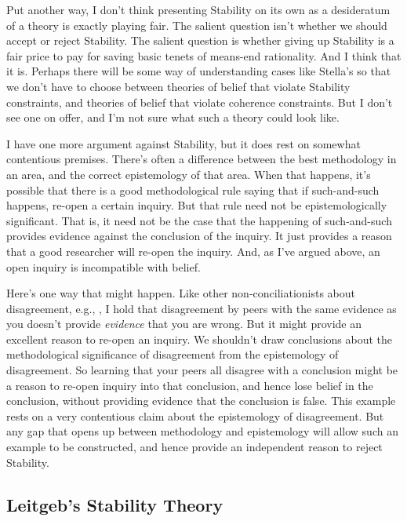 \documentclass[11pt,]{book}
\begin{document}
Put another way, I don't think presenting Stability on its own as a desideratum of a theory is exactly playing fair. The salient question isn't whether we should accept or reject Stability. The salient question is whether giving up Stability is a fair price to pay for saving basic tenets of means-end rationality. And I think that it is. Perhaps there will be some way of understanding cases like Stella's so that we don't have to choose between theories of belief that violate Stability constraints, and theories of belief that violate coherence constraints. But I don't see one on offer, and I'm not sure what such a theory could look like.

I have one more argument against Stability, but it does rest on somewhat contentious premises. There's often a difference between the best methodology in an area, and the correct epistemology of that area. When that happens, it's possible that there is a good methodological rule saying that if such-and-such happens, re-open a certain inquiry. But that rule need not be epistemologically significant. That is, it need not be the case that the happening of such-and-such provides evidence against the conclusion of the inquiry. It just provides a reason that a good researcher will re-open the inquiry. And, as I've argued above, an open inquiry is incompatible with belief.

Here's one way that might happen. Like other non-conciliationists about disagreement, e.g., \citet{Kelly2010-KELPDA}, I hold that disagreement by peers with the same evidence as you doesn't provide \emph{evidence} that you are wrong. But it might provide an excellent reason to re-open an inquiry. We shouldn't draw conclusions about the methodological significance of disagreement from the epistemology of disagreement. So learning that your peers all disagree with a conclusion might be a reason to re-open inquiry into that conclusion, and hence lose belief in the conclusion, without providing evidence that the conclusion is false. This example rests on a very contentious claim about the epistemology of disagreement. But any gap that opens up between methodology and epistemology will allow such an example to be constructed, and hence provide an independent reason to reject Stability.

\hypertarget{leitgeb}{%
\subsection{Leitgeb's Stability Theory}\label{leitgeb}}
\end{document}
